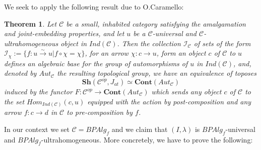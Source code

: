 \documentclass[a4paper]{amsproc}
\theoremstyle{plain}
\newtheorem{theorem}{Theorem}[section]
\theoremstyle{definition}
\theoremstyle{remark}
\numberwithin{equation}{section}
\begin{document}
We seek to apply the following result due to O.Caramello:

\begin{theorem}\label{olivia}
Let $\mathcal{C}$ be a small, inhabited category satisfying the amalgamation and joint-embedding properties, and let $u$ be a $\mathcal{C}$-universal and $\mathcal{C}$-ultrahomogeneous object in $Ind(\mathcal{C})$. Then the collection $\mathcal{I}_{\mathcal{C}}$ of sets of the form $\mathcal{I}_{\chi}:=\{f:u\overset{\sim}{\rightarrow} u| f\circ \chi=\chi\} $, for an arrow $\chi:c\rightarrow u$, form an object $c$ of $\mathcal{C}$ to $u$ defines an algebraic base for the group of automorphisms of $u$ in $Ind(\mathcal{C})$, and, denoted by $Aut_\mathcal{C}$ the resulting topological group, we have an equivalence of toposes
\[\textbf{Sh}(\mathcal{C}^{op},J_{at})\simeq \textbf{Cont}(Aut_\mathcal{C}) \]
induced by the functor $F:\mathcal{C}^{op}\rightarrow \textbf{Cont}(Aut_{\mathcal{C}})$ which sends any object $c$ of $\mathcal{C}$ to the set $Hom_{Ind(\mathcal{C})}(c,u)$ equipped with the action by post-composition and any arrow $f:c\rightarrow d$ in $\mathcal{C}$ to pre-composition by $f$.
\end{theorem}

In our context we set $\mathcal{C}=BPAlg_f$ and we claim that $(I, \lambda)$ is  $BPAlg_f$-universal and $BPAlg_f$-ultrahomogeneous. More concretely, we have to prove the following:
\end{document}
